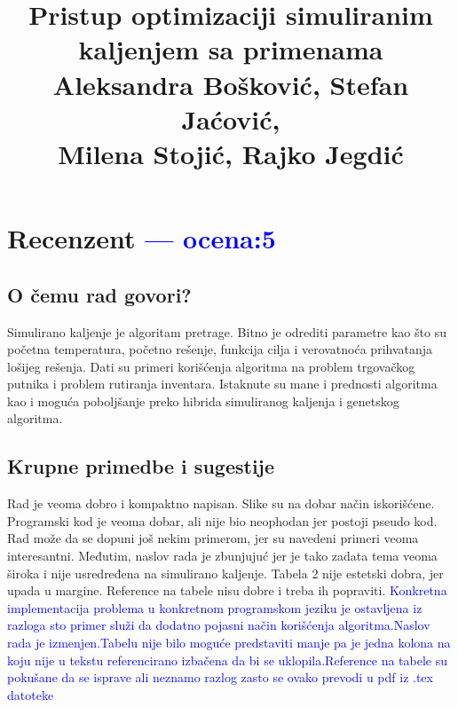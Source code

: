\documentclass[a4paper]{report}
\newcommand{\odgovor}[1]{\textcolor{blue}{#1}}
\begin{document}
\title{Pristup optimizaciji simuliranim kaljenjem sa primenama\\ \small{Aleksandra Bošković, Stefan Jaćović,\\Milena Stojić, Rajko Jegdić}}

\maketitle

\tableofcontents

\chapter{Recenzent \odgovor{--- ocena:5} }


\section{O čemu rad govori?}
Simulirano kaljenje je algoritam pretrage. Bitno je odrediti parametre kao što su početna temperatura, početno rešenje, funkcija cilja i verovatnoća prihvatanja lošijeg rešenja. Dati su primeri korišćenja algoritma na problem trgovačkog putnika i  problem rutiranja inventara. Istaknute su mane i prednosti algoritma kao i moguća poboljšanje preko hibrida simuliranog kaljenja i genetskog algoritma.
\section{Krupne primedbe i sugestije}
Rad je veoma dobro i kompaktno napisan. Slike su na dobar način iskorišćene. Programski kod je veoma dobar, ali nije bio neophodan jer postoji pseudo kod. Rad može da se dopuni još nekim primerom, jer su navedeni primeri veoma interesantni. 
Međutim, naslov rada je zbunjujuć jer je tako zadata tema veoma  široka i nije usredređena na simulirano kaljenje. Tabela 2 nije estetski dobra, jer upada u margine. Reference na tabele nisu dobre i treba ih popraviti. 
\odgovor {Konkretna implementacija problema u konkretnom programskom jeziku je ostavljena iz razloga sto primer služi da dodatno pojasni način korišćenja algoritma.Naslov rada je izmenjen.Tabelu nije bilo moguće predstaviti manje pa je jedna kolona na koju nije u tekstu referencirano izbačena da bi se uklopila.Reference na tabele su pokušane da se isprave ali neznamo razlog zasto se ovako prevodi u pdf iz .tex datoteke}
\end{document}
